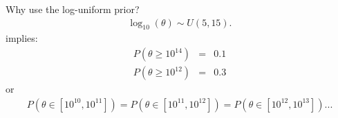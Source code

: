 \begin{frame}[t]{Why use the log-uniform prior?}
\begin{eqnarray*}
\log_{10}(\theta) \sim U(5, 15).
\end{eqnarray*}
implies:
\begin{eqnarray*}
P(\theta \geq 10^{14}) &=& 0.1\\
P(\theta \geq 10^{12}) &=& 0.3
\end{eqnarray*}
or
\begin{eqnarray*}
P(\theta \in [10^{10}, 10^{11}]) = P(\theta \in [10^{11}, 10^{12}])
= P(\theta \in [10^{12}, 10^{13}]) ...
\end{eqnarray*}

\end{frame}


